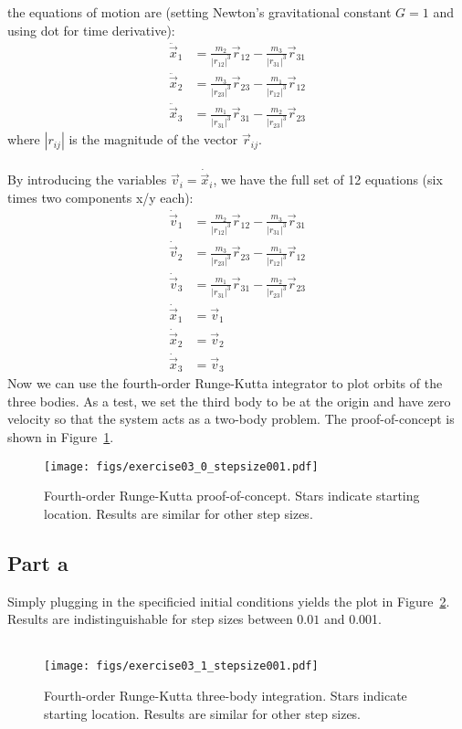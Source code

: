 \documentclass[12pt,a4paper,twoside]{article}
\begin{document}
the equations of motion are (setting Newton's gravitational constant $G=1$ and using dot for time derivative):
\begin{align*}
  \ddot{\vec x}_1 &= \frac{m_2}{|r_{12}|^3}\vec r_{12}-\frac{m_3}{|r_{31}|^3}\vec r_{31}\\
  \ddot {\vec x}_2 &= \frac{m_3}{|r_{23}|^3}\vec r_{23}-\frac{m_1}{|r_{12}|^3}\vec r_{12}\\
  \ddot {\vec x}_3 &= \frac{m_1}{|r_{31}|^3}\vec r_{31}-\frac{m_2}{|r_{23}|^3}\vec r_{23}
\end{align*}
where $|r_{ij}|$ is the magnitude of the vector $\vec r_{ij}$.\\
\\
By introducing the variables $\vec v_{i} = \dot{\vec x}_i$, we have the full set of 12 equations (six times two components x/y each):
\begin{align*}
  \dot {\vec v}_1 &= \frac{m_2}{|r_{12}|^3}\vec r_{12}-\frac{m_3}{|r_{31}|^3}\vec r_{31}\\
  \dot {\vec v}_2 &= \frac{m_3}{|r_{23}|^3}\vec r_{23}-\frac{m_1}{|r_{12}|^3}\vec r_{12}\\
  \dot {\vec v}_3 &= \frac{m_1}{|r_{31}|^3}\vec r_{31}-\frac{m_2}{|r_{23}|^3}\vec r_{23}\\
  \dot {\vec x}_1 &= \vec v_1\\
  \dot {\vec x}_2 &= \vec v_2\\
  \dot {\vec x}_3 &= \vec v_3
\end{align*}
Now we can use the fourth-order Runge-Kutta integrator to plot orbits of the three bodies. As a test, we set the third body to be at the origin and have zero velocity so that the system acts as a two-body problem. The proof-of-concept is shown in Figure~\ref{fig:circ}.
\begin{figure}[h!]
  \centering
  \texttt{[image: figs/exercise03\_0\_stepsize001.pdf]}
  \caption{Fourth-order Runge-Kutta proof-of-concept. Stars indicate starting location. Results are similar for other step sizes.} \label{fig:circ}
\end{figure}

\subsection*{Part a}
Simply plugging in the specificied initial conditions yields the plot in Figure~\ref{fig:2a}. Results are indistinguishable for step sizes between $0.01$ and 0.001.\\
\\
\begin{figure}[h!]
  \centering
  \texttt{[image: figs/exercise03\_1\_stepsize001.pdf]}
  \caption{Fourth-order Runge-Kutta three-body integration. Stars indicate starting location. Results are similar for other step sizes.} \label{fig:2a}
\end{figure}
\end{document}
